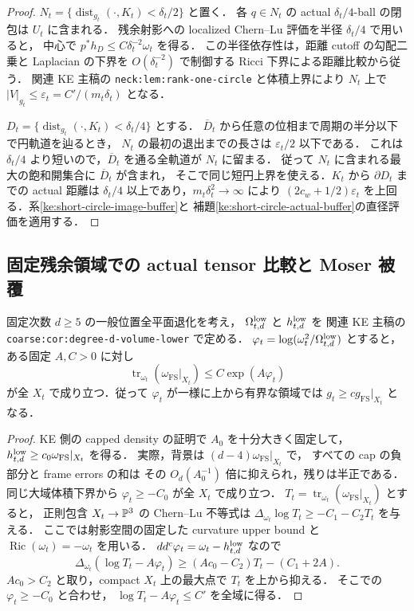 \begin{proof}
$N_t=\{\operatorname{dist}_{g_t}(\cdot,K_t)<\delta_t/2\}$ と置く．
各 $q\in N_t$ の actual $\delta_t/4$-ball の閉包は $U_t$ に含まれる．
残余射影への localized Chern--Lu 評価を半径 $\delta_t/4$ で用いると，
中心で $p^*h_D\le C\delta_t^{-2}\omega_t$ を得る．
この半径依存性は，距離 cutoff の勾配二乗と Laplacian の下界を
$O(\delta_t^{-2})$ で制御する Ricci 下界による距離比較から従う．
関連 KE 主稿の \texttt{neck:lem:rank-one-circle} と体積上界により
$N_t$ 上で $|V|_{g_t}\le\varepsilon_t=C'/(m_t\delta_t)$ となる．

$D_t=\{\operatorname{dist}_{g_t}(\cdot,K_t)<\delta_t/4\}$ とする．
$\overline D_t$ から任意の位相まで周期の半分以下で円軌道を辿るとき，
$N_t$ の最初の退出までの長さは $\varepsilon_t/2$ 以下である．
これは $\delta_t/4$ より短いので，$\overline D_t$ を通る全軌道が $N_t$ に留まる．
従って $N_t$ に含まれる最大の飽和開集合に $\overline D_t$ が含まれ，
そこで同じ短円上界を使える．$K_t$ から $\partial D_t$ までの actual 距離は
$\delta_t/4$ 以上であり，$m_t\delta_t^2\to\infty$ により
$(2c_w+1/2)\varepsilon_t$ を上回る．系\ref{ke:short-circle-image-buffer}と
補題\ref{ke:short-circle-actual-buffer}の直径評価を適用する．
\end{proof}

\subsection{固定残余領域での actual tensor 比較と Moser 被覆}

\begin{lemma}
\label{ke:capped-projective-lower}
固定次数 $d\ge5$ の一般位置全平面退化を考え，
$\Omega_{t,d}^{\rm low}$ と $h_{t,d}^{\rm low}$ を
関連 KE 主稿の \texttt{coarse:cor:degree-d-volume-lower} で定める．
$\varphi_t=\log(\omega_t^2/\Omega_{t,d}^{\rm low})$ とすると，
ある固定 $A,C>0$ に対し
\[
 \operatorname{tr}_{\omega_t}(\omega_{\mathrm{FS}}|_{X_t})
 \le C\exp(A\varphi_t)
\]
が全 $X_t$ で成り立つ．従って $\varphi_t$ が一様に上から有界な領域では
$g_t\ge c g_{\mathrm{FS}}|_{X_t}$ となる．
\end{lemma}

\begin{proof}
KE 側の capped density の証明で $A_0$ を十分大きく固定して，
$h_{t,d}^{\rm low}\ge c_0\omega_{\mathrm{FS}}|_{X_t}$ を得る．
実際，背景は $(d-4)\omega_{\mathrm{FS}}|_{X_t}$ で，
すべての cap の負部分と frame errors の和は
その $O_d(A_0^{-1})$ 倍に抑えられ，残りは半正である．
同じ大域体積下界から $\varphi_t\ge-C_0$ が全 $X_t$ で成り立つ．
$T_t=\operatorname{tr}_{\omega_t}(\omega_{\mathrm{FS}}|_{X_t})$ とすると，
正則包含 $X_t\to\mathbb P^3$ の Chern--Lu 不等式は
$\Delta_{\omega_t}\log T_t\ge-C_1-C_2 T_t$ を与える．
ここでは射影空間の固定した curvature upper bound と
$\operatorname{Ric}(\omega_t)=-\omega_t$ を用いる．
$dd^c\varphi_t=\omega_t-h_{t,d}^{\rm low}$ なので
\[
 \Delta_{\omega_t}(\log T_t-A\varphi_t)
 \ge (Ac_0-C_2)T_t-(C_1+2A).
\]
$Ac_0>C_2$ と取り，compact $X_t$ 上の最大点で $T_t$ を上から抑える．
そこでの $\varphi_t\ge-C_0$ と合わせ，
$\log T_t-A\varphi_t\le C'$ を全域に得る．
\end{proof}

